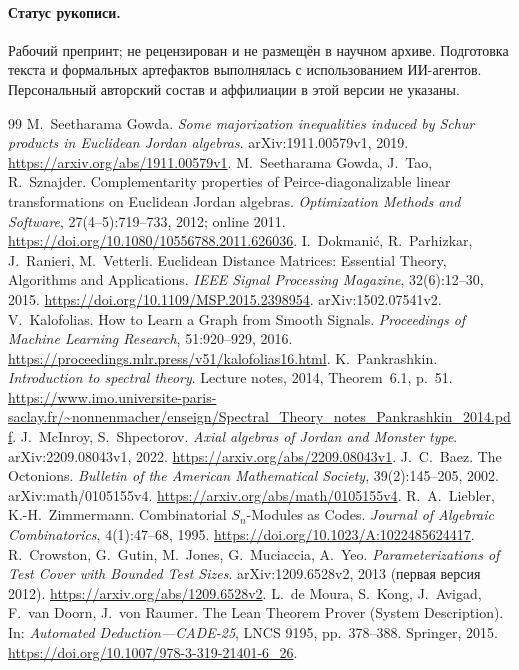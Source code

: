 \documentclass[11pt,a4paper]{article}
\numberwithin{equation}{section}
\theoremstyle{definition}
\theoremstyle{remark}
\begin{document}
\paragraph{Статус рукописи.}
Рабочий препринт; не рецензирован и не размещён
в научном архиве. Подготовка текста и формальных артефактов
выполнялась с использованием ИИ-агентов. Персональный авторский
состав и аффилиации в этой версии не указаны.

\begin{thebibliography}{99}
 M.~Seetharama Gowda. \emph{Some majorization inequalities induced by Schur products in Euclidean Jordan algebras}. arXiv:1911.00579v1, 2019. \url{https://arxiv.org/abs/1911.00579v1}.
 M.~Seetharama Gowda, J.~Tao, R.~Sznajder. Complementarity properties of Peirce-diagonalizable linear transformations on Euclidean Jordan algebras. \emph{Optimization Methods and Software}, 27(4--5):719--733, 2012; online 2011. \url{https://doi.org/10.1080/10556788.2011.626036}.
 I.~Dokmani\'c, R.~Parhizkar, J.~Ranieri, M.~Vetterli. Euclidean Distance Matrices: Essential Theory, Algorithms and Applications. \emph{IEEE Signal Processing Magazine}, 32(6):12--30, 2015. \url{https://doi.org/10.1109/MSP.2015.2398954}. arXiv:1502.07541v2.
 V.~Kalofolias. How to Learn a Graph from Smooth Signals. \emph{Proceedings of Machine Learning Research}, 51:920--929, 2016. \url{https://proceedings.mlr.press/v51/kalofolias16.html}.
 K.~Pankrashkin. \emph{Introduction to spectral theory}. Lecture notes, 2014, Theorem~6.1, p.~51. \url{https://www.imo.universite-paris-saclay.fr/~nonnenmacher/enseign/Spectral_Theory_notes_Pankrashkin_2014.pdf}.
 J.~McInroy, S.~Shpectorov. \emph{Axial algebras of Jordan and Monster type}. arXiv:2209.08043v1, 2022. \url{https://arxiv.org/abs/2209.08043v1}.
 J.~C.~Baez. The Octonions. \emph{Bulletin of the American Mathematical Society}, 39(2):145--205, 2002. arXiv:math/0105155v4. \url{https://arxiv.org/abs/math/0105155v4}.
 R.~A.~Liebler, K.-H.~Zimmermann. Combinatorial $S_n$-Modules as Codes. \emph{Journal of Algebraic Combinatorics}, 4(1):47--68, 1995. \url{https://doi.org/10.1023/A:1022485624417}.
 R.~Crowston, G.~Gutin, M.~Jones, G.~Muciaccia, A.~Yeo. \emph{Parameterizations of Test Cover with Bounded Test Sizes}. arXiv:1209.6528v2, 2013 (первая версия 2012). \url{https://arxiv.org/abs/1209.6528v2}.
 L.~de Moura, S.~Kong, J.~Avigad, F.~van Doorn, J.~von Raumer. The Lean Theorem Prover (System Description). In: \emph{Automated Deduction---CADE-25}, LNCS 9195, pp.~378--388. Springer, 2015. \url{https://doi.org/10.1007/978-3-319-21401-6_26}.
\end{thebibliography}
\end{document}
